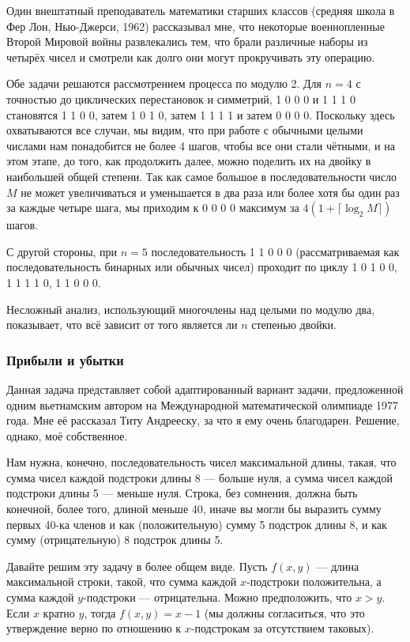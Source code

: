 Один внештатный преподаватель математики старших классов (средняя школа в Фер Лон, Нью-Джерси, 1962)
рассказывал мне,
что некоторые военнопленные Второй Мировой войны развлекались тем, что брали различные наборы из четырёх чисел и смотрели как долго они могут прокручивать эту операцию.

\medskip

Обе задачи решаются рассмотрением процесса по модулю 2.
Для $n=4$ с точностью до циклических перестановок и симметрий, 1 0 0 0 и
1 1 1 0 становятся 1 1 0 0, затем 1 0 1 0, затем 1 1 1 1 и затем 0 0 0 0.
Поскольку здесь охватываются все случаи, мы видим, что при работе с обычными целыми числами нам понадобится не более 4 шагов, чтобы все они стали чётными, и на этом этапе, до того, как продолжить далее, можно поделить их на двойку в наибольшей общей степени.
Так как самое большое в последовательности число $M$ не может увеличиваться и уменьшается в два раза или более хотя бы один раз за каждые четыре шага, 
мы приходим к 0 0 0 0 максимум за $4(1+\lceil\log_2 M\rceil)$ шагов.

С другой стороны, при $n=5$ последовательность 1 1 0 0 0 (рассматриваемая как последовательность бинарных или обычных чисел)
проходит по циклу 
1 0 1 0 0, 
1 1 1 1 0, 
1 1 0 0 0.\heart 

Несложный анализ, использующий многочлены над целыми по модулю два, показывает, что всё зависит от того является ли $n$ степенью двойки.

\subsubsection*{Прибыли и убытки}%

Данная задача представляет собой адаптированный вариант задачи, предложенной одним вьетнамским автором на Международной математической олимпиаде 1977 года.
Мне её рассказал Титу Андрееску, %
за что я ему очень благодарен.
Решение, однако, моё собственное.

Нам нужна, конечно, последовательность чисел максимальной длины, такая, что сумма чисел каждой подстроки длины 8 --- больше нуля, а сумма чисел каждой подстроки длины 5 --- меньше нуля.
Строка, без сомнения, должна быть конечной, более того, длиной меньше 40, иначе вы могли бы выразить сумму первых 40-ка членов и как (положительную) сумму 5 подстрок длины 8, и как сумму (отрицательную) 8 подстрок длины 5.

Давайте решим эту задачу в более общем виде.
Пусть $f(x,y)$ --- длина максимальной строки, такой, что сумма каждой $x$-подстроки положительна, а сумма каждой $y$-подстроки --- отрицательна.
Можно предположить, что $x>y$.
Если $x$ кратно $y$, тогда $f(x,y)=x-1$ (мы должны согласиться, что это утверждение верно по отношению к $x$-подстрокам за отсутствием таковых).

